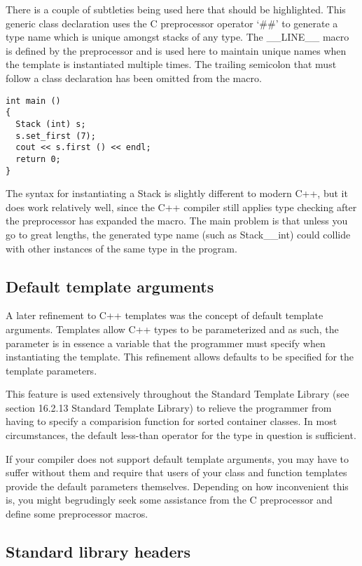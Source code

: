 There is a couple of subtleties being used here that should be highlighted. This generic class declaration uses the C preprocessor operator `\#\#' to generate a type name which is unique amongst stacks of any type. The \_{}\_{}LINE\_{}\_{} macro is defined by the preprocessor and is used here to maintain unique names when the template is instantiated multiple times. The trailing semicolon that must follow a class declaration has been omitted from the macro.

 	
\begin{verbatim}
int main ()
{
  Stack (int) s;
  s.set_first (7);
  cout << s.first () << endl;
  return 0;
}
\end{verbatim}

The syntax for instantiating a Stack is slightly different to modern C++, but it does work relatively well, since the C++ compiler still applies type checking after the preprocessor has expanded the macro. The main problem is that unless you go to great lengths, the generated type name (such as Stack\_{}\_{}int) could collide with other instances of the same type in the program. 

\subsection{Default template arguments}

A later refinement to C++ templates was the concept of default template arguments. Templates allow C++ types to be parameterized and as such, the parameter is in essence a variable that the programmer must specify when instantiating the template. This refinement allows defaults to be specified for the template parameters.

This feature is used extensively throughout the Standard Template Library (see section 16.2.13 Standard Template Library) to relieve the programmer from having to specify a comparision function for sorted container classes. In most circumstances, the default less-than operator for the type in question is sufficient.

If your compiler does not support default template arguments, you may have to suffer without them and require that users of your class and function templates provide the default parameters themselves. Depending on how inconvenient this is, you might begrudingly seek some assistance from the C preprocessor and define some preprocessor macros. 

\subsection{Standard library headers}

